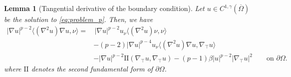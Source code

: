 \documentclass[10pt,a4paper]{amsart}
\numberwithin{equation}{section}
\newtheorem{lemma}[teo]{Lemma}
\begin{document}
\begin{lemma}[Tangential derivative of the boundary condition] \label{lem:tangential}
    Let $u \in C^{1,\gamma}(\overline{\Omega})$ be the solution to \eqref{eq:problem_p}. Then, we have
    \begin{equation*}
        \begin{aligned}
        |\nabla u|^{p-2}\langle(\nabla^2u)\nabla u,\nu\rangle = & \, |\nabla u|^{p-2} u_\nu \langle(\nabla^2u)\nu,\nu\rangle
        \\&-(p-2)|\nabla u|^{p-4} u_\nu \langle(\nabla^2u)\nabla u,\nabla_\top u\rangle
        \\&-|\nabla u|^{p-2} \mathrm{I\!I}(\nabla_\top u,\nabla_\top u)
        -(p-1)\beta|u|^{p-2} |\nabla_\top u|^{2} \qquad \text{on }\partial\Omega.
        \end{aligned}
    \end{equation*}
    where $\mathrm{I\!I}$ denotes the second fundamental form of $\partial\Omega$.
\end{lemma}
\end{document}
